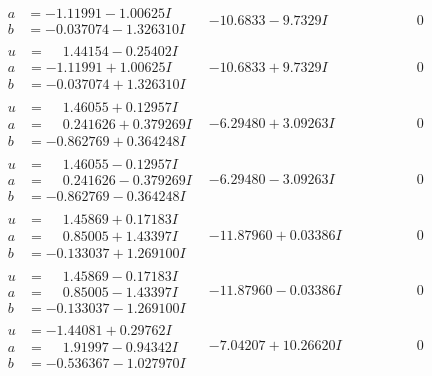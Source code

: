 \documentclass[1p]{elsarticle_modified}
\theoremstyle{definition}
\begin{document}
$$\begin{array}{c|c|c}
\begin{aligned}
a &= -1.11991 - 1.00625 I \\
b &= -0.037074 - 1.326310 I\end{aligned}
 & -10.6833 - 9.7329 I & \phantom{-0.000000 } 0 \\ \hline\begin{aligned}
u &= \phantom{-}1.44154 - 0.25402 I \\
a &= -1.11991 + 1.00625 I \\
b &= -0.037074 + 1.326310 I\end{aligned}
 & -10.6833 + 9.7329 I & \phantom{-0.000000 } 0 \\ \hline\begin{aligned}
u &= \phantom{-}1.46055 + 0.12957 I \\
a &= \phantom{-}0.241626 + 0.379269 I \\
b &= -0.862769 + 0.364248 I\end{aligned}
 & -6.29480 + 3.09263 I & \phantom{-0.000000 } 0 \\ \hline\begin{aligned}
u &= \phantom{-}1.46055 - 0.12957 I \\
a &= \phantom{-}0.241626 - 0.379269 I \\
b &= -0.862769 - 0.364248 I\end{aligned}
 & -6.29480 - 3.09263 I & \phantom{-0.000000 } 0 \\ \hline\begin{aligned}
u &= \phantom{-}1.45869 + 0.17183 I \\
a &= \phantom{-}0.85005 + 1.43397 I \\
b &= -0.133037 + 1.269100 I\end{aligned}
 & -11.87960 + 0.03386 I & \phantom{-0.000000 } 0 \\ \hline\begin{aligned}
u &= \phantom{-}1.45869 - 0.17183 I \\
a &= \phantom{-}0.85005 - 1.43397 I \\
b &= -0.133037 - 1.269100 I\end{aligned}
 & -11.87960 - 0.03386 I & \phantom{-0.000000 } 0 \\ \hline\begin{aligned}
u &= -1.44081 + 0.29762 I \\
a &= \phantom{-}1.91997 - 0.94342 I \\
b &= -0.536367 - 1.027970 I\end{aligned}
 & -7.04207 + 10.26620 I & \phantom{-0.000000 } 0 \\ \hline\begin{aligned}

\end{aligned}
\end{array}$$
\end{document}
